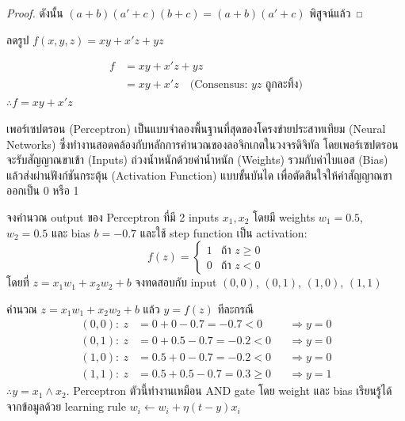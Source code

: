 \begin{proof}
ดังนั้น $(a + b)(a' + c)(b + c) = (a + b)(a' + c)$ พิสูจน์แล้ว
\end{proof}

\begin{ex}
\label{ex:consensus-simplify}
ลดรูป $f(x, y, z) = x y + x' z + y z$
\end{ex}
\begin{solution}
\begin{align*}
f &= x y + x' z + y z \\
  &= x y + x' z \quad \text{(Consensus: } yz \text{ ถูกละทิ้ง)}
\end{align*}
$\therefore f = x y + x' z$ \solhere
\end{solution}

เพอร์เซปตรอน (Perceptron) เป็นแบบจำลองพื้นฐานที่สุดของโครงข่ายประสาทเทียม (Neural Networks) ซึ่งทำงานสอดคล้องกับหลักการคำนวณของลอจิกเกตในวงจรดิจิทัล โดยเพอร์เซปตรอนจะรับสัญญาณขาเข้า (Inputs) ถ่วงน้ำหนักด้วยค่าน้ำหนัก (Weights) รวมกับค่าไบแอส (Bias) แล้วส่งผ่านฟังก์ชันกระตุ้น (Activation Function) แบบขั้นบันได เพื่อตัดสินใจให้ค่าสัญญาณขาออกเป็น 0 หรือ 1

\begin{ex}
\label{ex:perceptron}
จงคำนวณ output ของ Perceptron ที่มี 2 inputs $x_1, x_2$ โดยมี weights $w_1 = 0.5$, $w_2 = 0.5$ และ bias $b = -0.7$ และใช้ step function เป็น activation:
$$f(z) = \begin{cases} 1 & \text{ถ้า } z \geq 0 \\ 0 & \text{ถ้า } z < 0 \end{cases}$$
โดยที่ $z = x_1 w_1 + x_2 w_2 + b$ จงทดสอบกับ input $(0, 0)$, $(0, 1)$, $(1, 0)$, $(1, 1)$
\end{ex}
\begin{solution}
คำนวณ $z = x_1 w_1 + x_2 w_2 + b$ แล้ว $y = f(z)$ ทีละกรณี
\begin{align*}
(0,0):\ z &= 0 + 0 - 0.7 = -0.7 < 0 &&\Rightarrow y = 0\\
(0,1):\ z &= 0 + 0.5 - 0.7 = -0.2 < 0 &&\Rightarrow y = 0\\
(1,0):\ z &= 0.5 + 0 - 0.7 = -0.2 < 0 &&\Rightarrow y = 0\\
(1,1):\ z &= 0.5 + 0.5 - 0.7 = 0.3 \geq 0 &&\Rightarrow y = 1
\end{align*}
$\therefore y = x_1 \land x_2$. Perceptron ตัวนี้ทำงานเหมือน AND gate โดย weight และ bias เรียนรู้ได้จากข้อมูลด้วย learning rule $w_i \leftarrow w_i + \eta (t - y) x_i$ \solhere
\end{solution}

